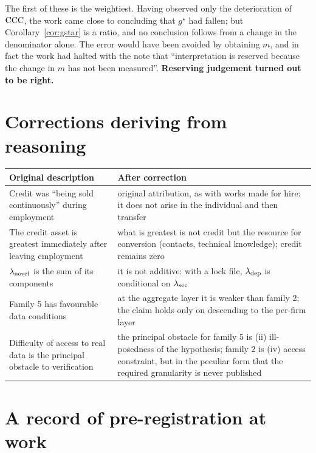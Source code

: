 The first of these is the weightiest. Having observed only the deterioration of $\mathrm{CCC}$, the work
came close to concluding that $g^\star$ had fallen; but Corollary~\ref{cor:gstar} is a ratio, and
no conclusion follows from a change in the denominator alone. The error would have been avoided by
obtaining $m$, and in fact the work had halted with the note that ``interpretation is reserved
because the change in $m$ has not been measured''. \textbf{Reserving judgement turned out to be
right.}

\section{Corrections deriving from reasoning}

\begin{center}
\begin{tabularx}{\textwidth}{@{}XX@{}}
\toprule
Original description & After correction \\
\midrule
Credit was ``being sold continuously'' during employment
& original attribution, as with works made for hire: it does not arise in the individual and then transfer \\
\addlinespace
The credit asset is greatest immediately after leaving employment
& what is greatest is not credit but the resource for conversion (contacts, technical knowledge); credit remains zero \\
\addlinespace
$\lambda_{\rm novel}$ is the sum of its components
& it is not additive: with a lock file, $\lambda_{\rm dep}$ is conditional on $\lambda_{\rm sec}$ \\
\addlinespace
Family 5 has favourable data conditions
& at the aggregate layer it is weaker than family 2; the claim holds only on descending to the per-firm layer \\
\addlinespace
Difficulty of access to real data is the principal obstacle to verification
& the principal obstacle for family 5 is (ii) ill-posedness of the hypothesis; family 2 is (iv) access constraint, but in the peculiar form that the required granularity is never published \\
\bottomrule
\end{tabularx}
\label{tab:reasoning-corrections}
\end{center}

\section{A record of pre-registration at work}

